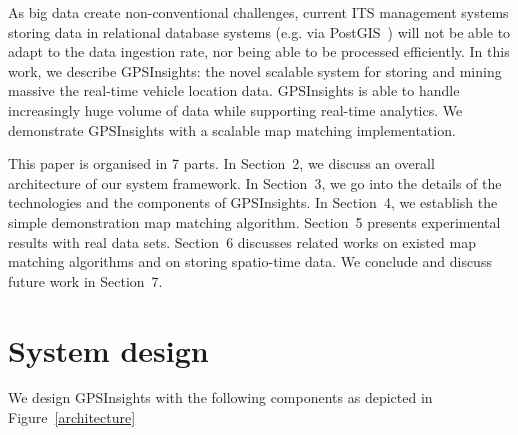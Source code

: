\documentclass{sig-alternate-05-2015}
\begin{document}
As big data create non-conventional challenges, current ITS management systems storing data in relational database systems (e.g. via PostGIS~\cite{posgis}) will not be able to adapt to the data ingestion rate, nor being able to be processed efficiently. In this work, we describe GPSInsights: the novel scalable system for storing and mining massive the real-time vehicle location data. GPSInsights is able to handle increasingly huge volume of data while supporting real-time analytics. We demonstrate GPSInsights with a scalable map matching implementation. 

This paper is organised in 7 parts. In Section~2, we discuss an overall architecture of our system framework. In Section~3, we go into the details of the technologies and the components of GPSInsights. In Section~4, we establish the simple demonstration map matching algorithm. Section~5 presents experimental results with real data sets. Section~6 discusses related works on existed map matching algorithms and on storing spatio-time data. We conclude and discuss future work in Section~7.

\section{System design} 

We design GPSInsights with the following components as depicted in Figure~\ref{architecture}
\end{document}
